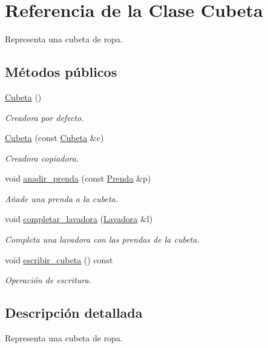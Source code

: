 \hypertarget{class_cubeta}{\section{Referencia de la Clase Cubeta}
\label{class_cubeta}
}


Representa una cubeta de ropa.  


\subsection*{Métodos públicos}
\begin{DoxyCompactItemize}
\item 
\hyperlink{class_cubeta_ae85e70c9cd67454446439891e3f435e1}{Cubeta} ()
\begin{DoxyCompactList}\small\item\em Creadora por defecto. \end{DoxyCompactList}\item 
\hyperlink{class_cubeta_a9615e48038899c5732f61661585f12c7}{Cubeta} (const \hyperlink{class_cubeta}{Cubeta} \&c)
\begin{DoxyCompactList}\small\item\em Creadora copiadora. \end{DoxyCompactList}\item 
void \hyperlink{class_cubeta_a431873df8f99cebe56b4787a5271e395}{anadir\-\_\-prenda} (const \hyperlink{class_prenda}{Prenda} \&p)
\begin{DoxyCompactList}\small\item\em Añade una prenda a la cubeta. \end{DoxyCompactList}\item 
void \hyperlink{class_cubeta_a3586257f2f2eacefc47714c6a3a01875}{completar\-\_\-lavadora} (\hyperlink{class_lavadora}{Lavadora} \&l)
\begin{DoxyCompactList}\small\item\em Completa una lavadora con las prendas de la cubeta. \end{DoxyCompactList}\item 
void \hyperlink{class_cubeta_a3448e45131b077516b3f12fe027642dd}{escribir\-\_\-cubeta} () const 
\begin{DoxyCompactList}\small\item\em Operación de escritura. \end{DoxyCompactList}\end{DoxyCompactItemize}


\subsection{Descripción detallada}
Representa una cubeta de ropa. 

